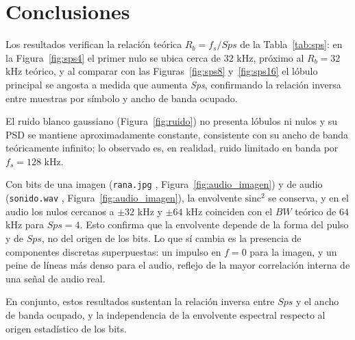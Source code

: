 \documentclass[twocolumn]{IEEEtran}
\begin{document}
\section{Conclusiones}

Los resultados verifican la relación teórica $R_b = f_s/Sps$ de la Tabla~\ref{tab:sps}: en la Figura~\ref{fig:sps4} el primer nulo se ubica cerca de $32$ kHz, próximo al $R_b=32$ kHz teórico, y al comparar con las Figuras~\ref{fig:sps8} y~\ref{fig:sps16} el lóbulo principal se angosta a medida que aumenta \emph{Sps}, confirmando la relación inversa entre muestras por símbolo y ancho de banda ocupado.

El ruido blanco gaussiano (Figura~\ref{fig:ruido}) no presenta lóbulos ni nulos y su PSD se mantiene aproximadamente constante, consistente con su ancho de banda teóricamente infinito; lo observado es, en realidad, ruido limitado en banda por $f_s=128$ kHz.

Con bits de una imagen (\texttt{rana.jpg} \cite{ortega2021rana} , Figura~\ref{fig:audio_imagen}) y de audio (\texttt{sonido.wav}  \cite{ortega2021sonido}, Figura~\ref{fig:audio_imagen}), la envolvente $\text{sinc}^2$ se conserva, y en el audio los nulos cercanos a $\pm32$ kHz y $\pm64$ kHz coinciden con el $BW$ teórico de $64$ kHz para $Sps=4$. Esto confirma que la envolvente depende de la forma del pulso y de $Sps$, no del origen de los bits. Lo que sí cambia es la presencia de componentes discretas superpuestas: un impulso en $f=0$ para la imagen, y un peine de líneas más denso para el audio, reflejo de la mayor correlación interna de una señal de audio real.

En conjunto, estos resultados sustentan la relación inversa entre $Sps$ y el ancho de banda ocupado, y la independencia de la envolvente espectral respecto al origen estadístico de los bits.














\nocite{*}



\end{document}
